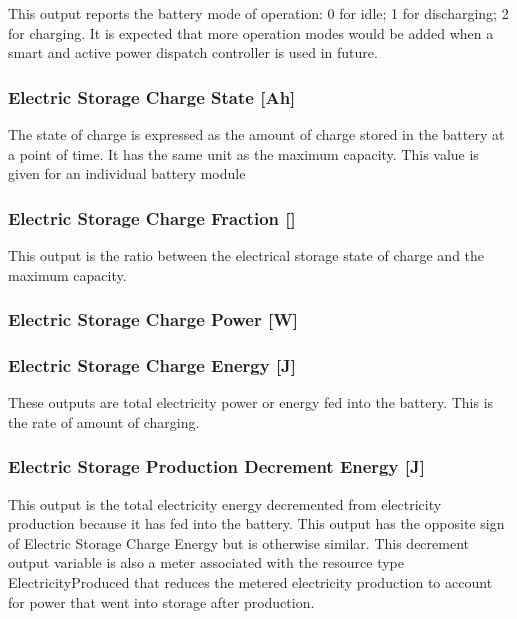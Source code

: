 This output reports the battery mode of operation: 0 for idle; 1 for discharging; 2 for charging. It is expected that more operation modes would be added when a smart and active power dispatch controller is used in future.

\subsubsection{Electric Storage Charge State {[}Ah{]}}\label{electric-storage-charge-state-ah}

The state of charge is expressed as the amount of charge stored in the battery at a point of time. It has the same unit as the maximum capacity. This value is given for an individual battery module

\subsubsection{Electric Storage Charge Fraction {[]}}\label{electric-storage-charge-fraction}

This output is the ratio between the electrical storage state of charge and the maximum capacity.

\subsubsection{Electric Storage Charge Power {[}W{]}}\label{electric-storage-charge-power-w-1}

\subsubsection{Electric Storage Charge Energy {[}J{]}}\label{electric-storage-charge-energy-j-1}

These outputs are total electricity power or energy fed into the battery. This is the rate of amount of charging.

\subsubsection{Electric Storage Production Decrement Energy {[}J{]}}\label{electric-storage-production-decrement-energy-j-1}

This output is the total electricity energy decremented from electricity production because it has fed into the battery. This output has the opposite sign of Electric Storage Charge Energy but is otherwise similar. This decrement output variable is also a meter associated with the resource type ElectricityProduced that reduces the metered electricity production to account for power that went into storage after production.


